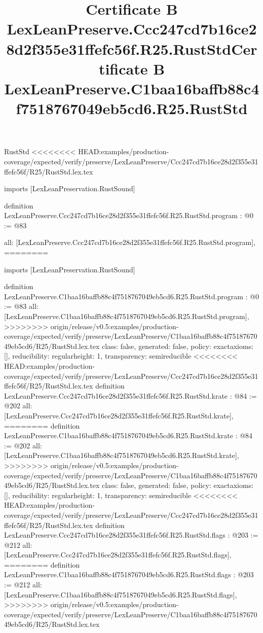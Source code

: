 \begin{lexlean}{RustStd}
<<<<<<<< HEAD:examples/production-coverage/expected/verify/preserve/LexLeanPreserve/Ccc247cd7b16ce28d2f355e31ffefc56f/R25/RustStd.lex.tex
\title{Certificate B LexLeanPreserve.Ccc247cd7b16ce28d2f355e31ffefc56f.R25.RustStd}
\begin{coremodule}
imports [LexLeanPreservation.RustSound]

definition LexLeanPreserve.Ccc247cd7b16ce28d2f355e31ffefc56f.R25.RustStd.program : @0 := @83 {
  all: [LexLeanPreserve.Ccc247cd7b16ce28d2f355e31ffefc56f.R25.RustStd.program],
========
\title{Certificate B LexLeanPreserve.C1baa16baffb88c4f7518767049eb5cd6.R25.RustStd}
\begin{coremodule}
imports [LexLeanPreservation.RustSound]

definition LexLeanPreserve.C1baa16baffb88c4f7518767049eb5cd6.R25.RustStd.program : @0 := @83 {
  all: [LexLeanPreserve.C1baa16baffb88c4f7518767049eb5cd6.R25.RustStd.program],
>>>>>>>> origin/release/v0.5:examples/production-coverage/expected/verify/preserve/LexLeanPreserve/C1baa16baffb88c4f7518767049eb5cd6/R25/RustStd.lex.tex
  class: false,
  generated: false,
  policy: exact{axioms: []},
  reducibility: regular{height: 1},
  transparency: semireducible
}
<<<<<<<< HEAD:examples/production-coverage/expected/verify/preserve/LexLeanPreserve/Ccc247cd7b16ce28d2f355e31ffefc56f/R25/RustStd.lex.tex
definition LexLeanPreserve.Ccc247cd7b16ce28d2f355e31ffefc56f.R25.RustStd.krate : @84 := @202 {
  all: [LexLeanPreserve.Ccc247cd7b16ce28d2f355e31ffefc56f.R25.RustStd.krate],
========
definition LexLeanPreserve.C1baa16baffb88c4f7518767049eb5cd6.R25.RustStd.krate : @84 := @202 {
  all: [LexLeanPreserve.C1baa16baffb88c4f7518767049eb5cd6.R25.RustStd.krate],
>>>>>>>> origin/release/v0.5:examples/production-coverage/expected/verify/preserve/LexLeanPreserve/C1baa16baffb88c4f7518767049eb5cd6/R25/RustStd.lex.tex
  class: false,
  generated: false,
  policy: exact{axioms: []},
  reducibility: regular{height: 1},
  transparency: semireducible
}
<<<<<<<< HEAD:examples/production-coverage/expected/verify/preserve/LexLeanPreserve/Ccc247cd7b16ce28d2f355e31ffefc56f/R25/RustStd.lex.tex
definition LexLeanPreserve.Ccc247cd7b16ce28d2f355e31ffefc56f.R25.RustStd.flags : @203 := @212 {
  all: [LexLeanPreserve.Ccc247cd7b16ce28d2f355e31ffefc56f.R25.RustStd.flags],
========
definition LexLeanPreserve.C1baa16baffb88c4f7518767049eb5cd6.R25.RustStd.flags : @203 := @212 {
  all: [LexLeanPreserve.C1baa16baffb88c4f7518767049eb5cd6.R25.RustStd.flags],
>>>>>>>> origin/release/v0.5:examples/production-coverage/expected/verify/preserve/LexLeanPreserve/C1baa16baffb88c4f7518767049eb5cd6/R25/RustStd.lex.tex
}}}
\end{coremodule}}
\end{coremodule}
\end{lexlean}

